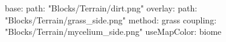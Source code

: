 base:
  path: "Blocks/Terrain/dirt.png"
overlay:
  path: "Blocks/Terrain/grass_side.png"
  method: grass
  coupling: "Blocks/Terrain/mycelium_side.png"
  useMapColor: biome
